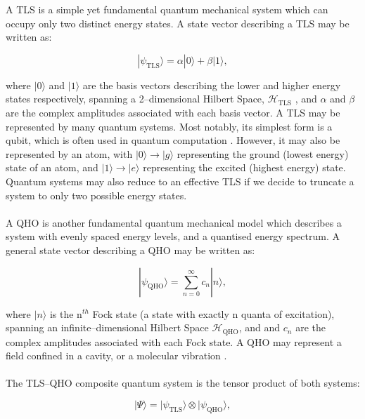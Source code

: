 \documentclass[12pt]{article}
\begin{document}
A TLS is a simple yet fundamental quantum mechanical system which can occupy only two distinct energy states. A state vector describing a TLS may be written as:

\begin{equation}
    |\psi_{\scriptscriptstyle \text{TLS}}\rangle = \alpha|0\rangle + \beta|1\rangle,
\end{equation}

where $|0\rangle$ and $|1\rangle$ are the basis vectors describing the lower and higher energy states respectively, spanning a 2--dimensional Hilbert Space, $\mathcal{H}_{\scriptscriptstyle \text{TLS}}$ , and $\alpha$ and $\beta$ are the complex amplitudes associated with each basis vector. A TLS may be represented by many quantum systems. Most notably, its simplest form is a qubit, which is often used in quantum computation \cite{TLS2024-qubits}. However, it may also be represented by an atom, with $|0\rangle \rightarrow |g\rangle$ representing the ground (lowest energy) state of an atom, and $|1\rangle \rightarrow |e\rangle$ representing the excited (highest energy) state. Quantum systems may also reduce to an effective TLS if we decide to truncate a system to only two possible energy states. \\
\\
A QHO is another fundamental quantum mechanical model which describes a system with evenly spaced energy levels, and a quantised energy spectrum. A general state vector describing a QHO may be written as:

\begin{equation}
|\psi_{\scriptscriptstyle \text{QHO}}\rangle = \sum_{n=0}^\infty c_n |n\rangle,
\end{equation}

where $|n\rangle$ is the n$^{th}$ Fock state (a state with exactly n quanta of excitation), spanning an infinite--dimensional Hilbert Space $\mathcal{H}_{\scriptscriptstyle \text{QHO}}$, and and $c_n$ are the complex amplitudes associated with each Fock state. A QHO may represent a field confined in a cavity, or a molecular vibration \cite{Context2004-CQED_JCM}.\\
\\
The TLS--QHO composite quantum system is the tensor product of both systems:

\begin{equation}
    |\Psi\rangle = |\psi_{\scriptscriptstyle \text{TLS}}\rangle \otimes |\psi_{\scriptscriptstyle \text{QHO}}\rangle,
\end{equation}
\end{document}

